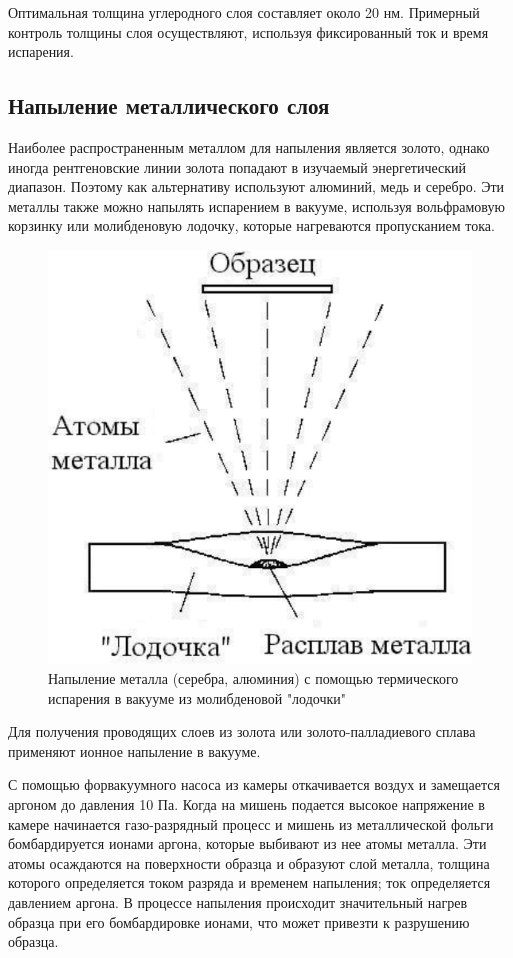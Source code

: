 \documentclass[12pt]{article}
\begin{document}
Оптимальная толщина углеродного слоя составляет около 20 нм. Примерный контроль толщины слоя осуществляют, используя фиксированный ток и время испарения. 

\subsection*{Напыление металлического слоя}

Наиболее распространенным металлом для напыления является золото, однако иногда рентгеновские линии золота попадают в изучаемый энергетический диапазон. Поэтому как альтернативу используют алюминий, медь и серебро. Эти металлы также можно напылять испарением в вакууме, используя вольфрамовую корзинку или молибденовую лодочку, которые нагреваются пропусканием тока. 

\begin{figure}[!ht]
\centering
\includegraphics[scale = 0.5]{pictures/boat.png}
\caption{Напыление металла (серебра, алюминия) с помощью термического испарения в вакууме из молибденовой "лодочки"}
\end{figure}

Для получения проводящих слоев из золота или золото-палладиевого сплава применяют ионное напыление в вакууме. \par
С помощью форвакуумного насоса из камеры откачивается воздух и замещается аргоном до давления 10 Па. Когда на мишень подается высокое напряжение в камере начинается газо-разрядный процесс и мишень из металлической фольги бомбардируется ионами аргона, которые выбивают из нее атомы металла. Эти атомы осаждаются на поверхности образца и образуют слой металла, толщина которого определяется током разряда и временем напыления; ток определяется давлением аргона. В процессе напыления происходит значительный нагрев образца при его бомбардировке ионами, что может привезти к разрушению образца. 
\end{document}
